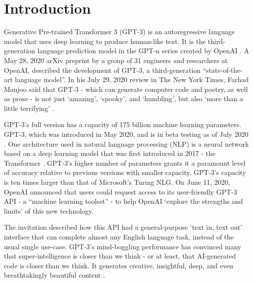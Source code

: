 \chapter*{Introduction}
\label{chap:introduction}
\thispagestyle{fancy}

\hspace{0.5cm} Generative Pre-trained Transformer 3 (GPT-3) is an autoregressive language model that uses deep learning to produce human-like text. It is the third-generation language prediction model in the GPT-n series created by OpenAI \cite{wiki:gpt3}. A May 28, 2020 arXiv preprint by a group of 31 engineers and researchers at OpenAI, described the development of GPT-3, a third-generation ``state-of-the-art language model''. In his July 29, 2020 review in The New York Times, Farhad Manjoo said that GPT-3 - which can generate computer code and poetry, as well as prose - is not just `amazing', `spooky', and `humbling', but also `more than a little terrifying' \cite{art:hhwt}.

GPT-3's full version has a capacity of 175 billion machine learning parameters. GPT-3, which was introduced in May 2020, and is in beta testing as of July 2020 \cite{art:wtla}. One architecture used in natural language processing (NLP) is a neural network based on a deep learning model that was first introduced in 2017 - the Transformer \cite{2017arXiv170603762V}. GPT-3's higher number of parameters grants it a paramount level of accuracy relative to previous versions with smaller capacity. GPT-3's capacity is ten times larger than that of Microsoft's Turing NLG. On June 11, 2020, OpenAI announced that users could request access to its user-friendly GPT-3 API - a ``machine learning toolset'' - to help OpenAI `explore the strengths and limits' of this new technology.

The invitation described how this API had a general-purpose `text in, text out' interface that can complete almost any English language task, instead of the usual single use-case. GPT-3's mind-boggling performance has convinced many that super-intelligence is closer than we think - or at least, that AI-generated code is closer than we think. It generates creative, insightful, deep, and even breathtakingly beautiful content \cite{art:wtla}.
\vspace*{\fill}